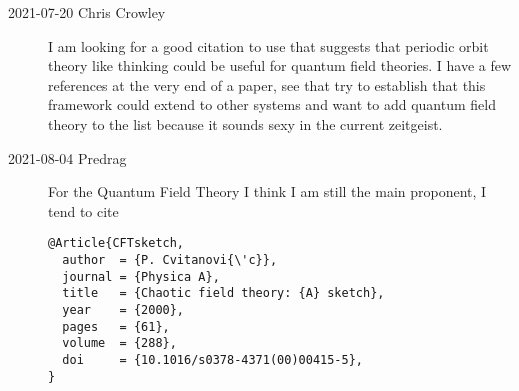 \begin{description}

\item[2021-07-20 Chris Crowley]
I am looking for a good citation to use that suggests that periodic orbit
theory like thinking could be useful for quantum field theories. I have a
few references at the very end of a paper, see
%
%
%
%
%
%
that try to establish that
this framework could extend to other systems and want to add quantum
field theory to the list because it sounds sexy in the current zeitgeist.

\item[2021-08-04 Predrag]
For the Quantum Field Theory I think I am still the main proponent, I
tend to cite

\begin{verbatim}
@Article{CFTsketch,
  author  = {P. Cvitanovi{\'c}},
  journal = {Physica A},
  title   = {Chaotic field theory: {A} sketch},
  year    = {2000},
  pages   = {61},
  volume  = {288},
  doi     = {10.1016/s0378-4371(00)00415-5},
}
\end{verbatim}

\end{description}
